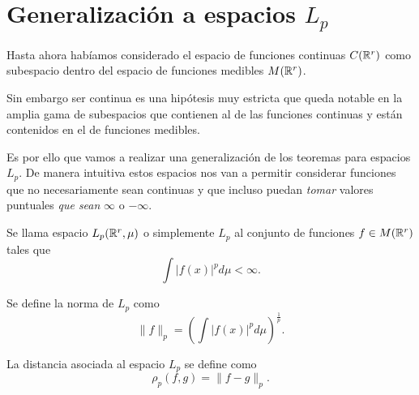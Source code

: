 %
\section{Generalización a espacios $L_p$}  

Hasta ahora habíamos considerado el espacio de funciones continuas 
$C(\mathbb{R}^r)$ 
como subespacio dentro del espacio de funciones medibles $M(\mathbb{R}^r)$. 

Sin embargo ser continua es una hipótesis muy estricta que queda
notable en la amplia gama de subespacios que contienen al de 
las funciones continuas y están contenidos en el de funciones medibles. 

Es por ello que vamos a realizar una generalización de los teoremas
para espacios $L_p$. De manera intuitiva estos espacios nos van a 
permitir considerar funciones que no necesariamente sean continuas
y que incluso puedan \textit{tomar} valores puntuales \textit{que sean}
$\infty$ o $- \infty$. 

\begin{definicion}[Espacios Lp]
    Se llama espacio $L_p(\mathbb{R}^r, \mu)$ o simplemente $L_p$ al conjunto 
    de funciones $f \in M(\mathbb{R}^r)$ tales que 
    \begin{equation}
        \int |f(x)|^p d\mu < \infty. 
    \end{equation}

Se define la norma de $L_p$ como 
\begin{equation}
    \| f\|_p 
    =
    \left(\int |f(x)|^p d\mu \right)^\frac{1}{p}.
\end{equation}

La distancia asociada al espacio $L_p$ se define como 
\begin{equation}
    \rho_p(f,g) = \| f-g\|_p.
\end{equation}
\end{definicion}

